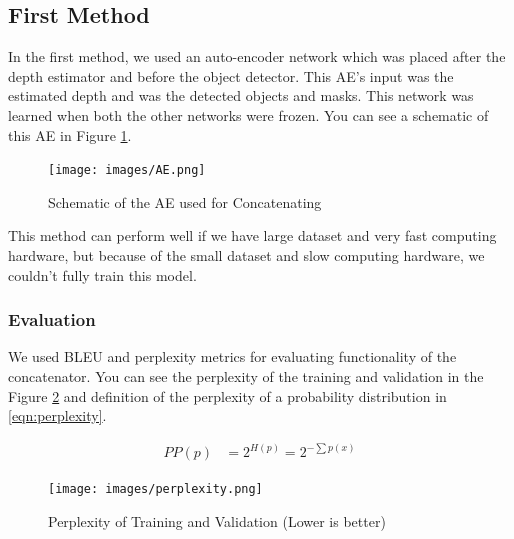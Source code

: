 \documentclass[a4paper, openany]{book}
\begin{document}
\subsection{First Method}
	\vspace{0.3cm}

In the first method, we used an auto-encoder network which was placed after the depth estimator and before the object detector. This AE's input was the estimated depth and was the detected objects and masks. This network was learned when both the other networks were frozen. You can see a schematic of this AE in Figure \ref{fig:AE}.


\begin{figure}[ht]
  \centering
    \texttt{[image: images/AE.png]}
      \caption{Schematic of the AE used for Concatenating}
  \label{fig:AE}
\end{figure}

This method can perform well if we have large dataset and very fast computing hardware, but because of the small dataset and slow computing hardware, we couldn't fully train this model.

\subsubsection{Evaluation}
	\vspace{0.3cm}
We used BLEU and perplexity metrics for evaluating functionality of the concatenator. You can see the perplexity of the training and validation in the Figure \ref{fig:perplexity} and definition of the perplexity of a probability distribution in \ref{eqn:perplexity}.

\begin{eqnarray}
PP(p) &= 2^{H(p)} = 2^{-\sum p(x)} \label{eqn:perplexity}
\end{eqnarray}

\begin{figure}[ht]
  \centering
    \texttt{[image: images/perplexity.png]}
      \caption{Perplexity of Training and Validation (Lower is better)}
  \label{fig:perplexity}
\end{figure}

\newpage
\end{document}
